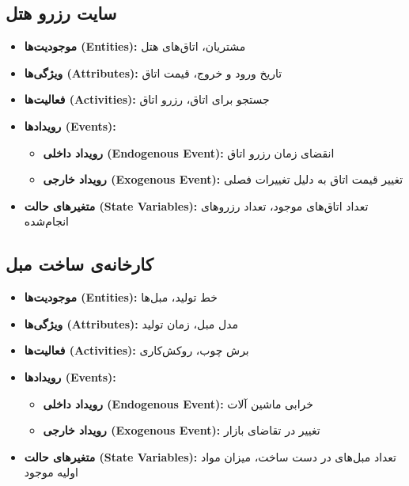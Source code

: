 \subsection*{سایت رزرو هتل}
\begin{itemize}
	\item \textbf{موجودیت‌ها (Entities):} مشتریان، اتاق‌های هتل
	\item \textbf{ویژگی‌ها (Attributes):} تاریخ ورود و خروج، قیمت اتاق
	\item \textbf{فعالیت‌ها (Activities):} جستجو برای اتاق، رزرو اتاق
	\item \textbf{رویدادها (Events):}
	\begin{itemize}
		\item \textbf{رویداد داخلی (Endogenous Event):} انقضای زمان رزرو اتاق
		\item \textbf{رویداد خارجی (Exogenous Event):} تغییر قیمت اتاق به دلیل تغییرات فصلی
	\end{itemize}
	\item \textbf{متغیرهای حالت (State Variables):} تعداد اتاق‌های موجود، تعداد رزروهای انجام‌شده
\end{itemize}

\subsection*{کارخانه‌ی ساخت مبل}
\begin{itemize}
	\item \textbf{موجودیت‌ها (Entities):} خط تولید، مبل‌ها
	\item \textbf{ویژگی‌ها (Attributes):} مدل مبل، زمان تولید
	\item \textbf{فعالیت‌ها (Activities):} برش چوب، روکش‌کاری
	\item \textbf{رویدادها (Events):}
	\begin{itemize}
		\item \textbf{رویداد داخلی (Endogenous Event):} خرابی ماشین آلات
		\item \textbf{رویداد خارجی (Exogenous Event):} تغییر در تقاضای بازار
	\end{itemize}
	\item \textbf{متغیرهای حالت (State Variables):} تعداد مبل‌های در دست ساخت، میزان مواد اولیه موجود
\end{itemize}